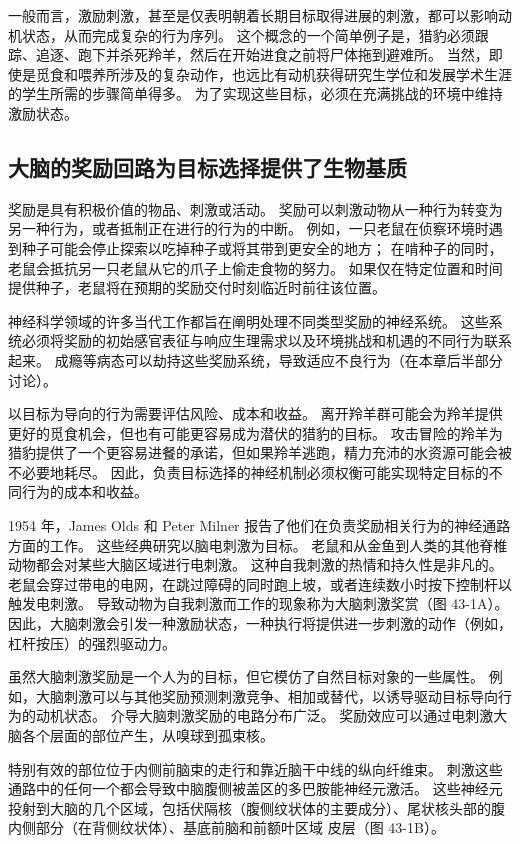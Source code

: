 一般而言，激励刺激，甚至是仅表明朝着长期目标取得进展的刺激，都可以影响动机状态，从而完成复杂的行为序列。 这个概念的一个简单例子是，猎豹必须跟踪、追逐、跑下并杀死羚羊，然后在开始进食之前将尸体拖到避难所。 当然，即使是觅食和喂养所涉及的复杂动作，也远比有动机获得研究生学位和发展学术生涯的学生所需的步骤简单得多。 为了实现这些目标，必须在充满挑战的环境中维持激励状态。

\subsection{大脑的奖励回路为目标选择提供了生物基质}
奖励是具有积极价值的物品、刺激或活动。 奖励可以刺激动物从一种行为转变为另一种行为，或者抵制正在进行的行为的中断。 例如，一只老鼠在侦察环境时遇到种子可能会停止探索以吃掉种子或将其带到更安全的地方； 在啃种子的同时，老鼠会抵抗另一只老鼠从它的爪子上偷走食物的努力。 如果仅在特定位置和时间提供种子，老鼠将在预期的奖励交付时刻临近时前往该位置。

神经科学领域的许多当代工作都旨在阐明处理不同类型奖励的神经系统。 这些系统必须将奖励的初始感官表征与响应生理需求以及环境挑战和机遇的不同行为联系起来。 成瘾等病态可以劫持这些奖励系统，导致适应不良行为（在本章后半部分讨论）。

以目标为导向的行为需要评估风险、成本和收益。 离开羚羊群可能会为羚羊提供更好的觅食机会，但也有可能更容易成为潜伏的猎豹的目标。 攻击冒险的羚羊为猎豹提供了一个更容易进餐的承诺，但如果羚羊逃跑，精力充沛的水资源可能会被不必要地耗尽。 因此，负责目标选择的神经机制必须权衡可能实现特定目标的不同行为的成本和收益。

1954 年，James Olds 和 Peter Milner 报告了他们在负责奖励相关行为的神经通路方面的工作。 这些经典研究以脑电刺激为目标。 老鼠和从金鱼到人类的其他脊椎动物都会对某些大脑区域进行电刺激。 这种自我刺激的热情和持久性是非凡的。 老鼠会穿过带电的电网，在跳过障碍的同时跑上坡，或者连续数小时按下控制杆以触发电刺激。 导致动物为自我刺激而工作的现象称为大脑刺激奖赏（图 43-1A）。 因此，大脑刺激会引发一种激励状态，一种执行将提供进一步刺激的动作（例如，杠杆按压）的强烈驱动力。

虽然大脑刺激奖励是一个人为的目标，但它模仿了自然目标对象的一些属性。 例如，大脑刺激可以与其他奖励预测刺激竞争、相加或替代，以诱导驱动目标导向行为的动机状态。 介导大脑刺激奖励的电路分布广泛。 奖励效应可以通过电刺激大脑各个层面的部位产生，从嗅球到孤束核。

特别有效的部位位于内侧前脑束的走行和靠近脑干中线的纵向纤维束。 刺激这些通路中的任何一个都会导致中脑腹侧被盖区的多巴胺能神经元激活。 这些神经元投射到大脑的几个区域，包括伏隔核（腹侧纹状体的主要成分）、尾状核头部的腹内侧部分（在背侧纹状体）、基底前脑和前额叶区域 皮层（图 43-1B）。

